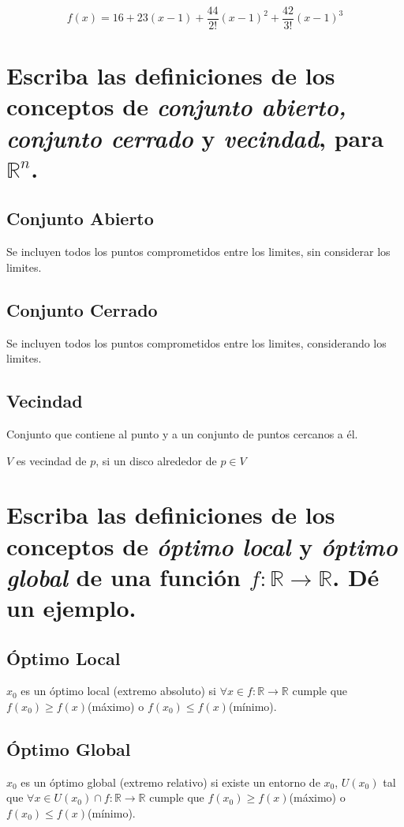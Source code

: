 \documentclass[12pt,oneside]{book}
\begin{document}
\begin{equation*}
    f(x) = 16+23(x-1) + \frac{44}{2!}(x-1)^2 + \frac{42}{3!}(x-1)^3
\end{equation*}

\section[Definiciones Conjuntos]{Escriba las definiciones de los conceptos de \textit{conjunto abierto, conjunto
cerrado} y \textit{vecindad}, para $\mathbb{R}^n$.}

\subsection{Conjunto Abierto}
Se incluyen todos los puntos comprometidos entre los limites, sin considerar los limites.

\subsection{Conjunto Cerrado}
Se incluyen todos los puntos comprometidos entre los limites, considerando los limites.

\subsection{Vecindad}
Conjunto que contiene al punto y a un conjunto de puntos cercanos a él.

$V$ es vecindad de $p$, si un disco alrededor de $p\in V$  

\section[Óptimo Local y Global $\mathbb{R}$]{Escriba las definiciones de los conceptos de \textit{óptimo local} y \textit{óptimo global}
de una función $f: \mathbb{R} \rightarrow \mathbb{R}$. Dé un ejemplo.}

\subsection{Óptimo Local}
$x_0$ es un óptimo local (extremo absoluto) si $\forall x \in f: \mathbb{R} \rightarrow \mathbb{R}$ cumple que $f(x_0) \geq f(x)$(máximo) o $f(x_0) \leq f(x)$(mínimo).

\subsection{Óptimo Global}
$x_0$ es un óptimo global (extremo relativo) si existe un entorno de $x_0$, $U(x_0)$ tal que  $\forall x \in U(x_0) \cap f: \mathbb{R} \rightarrow \mathbb{R}$ cumple que $f(x_0) \geq f(x)$(máximo) o $f(x_0) \leq f(x)$(mínimo).
\end{document}
